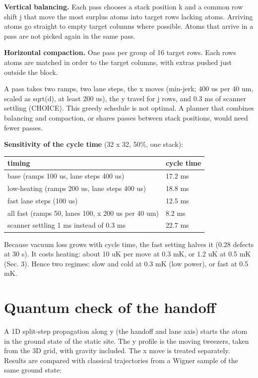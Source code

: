 \textbf{Vertical balancing.} Each pass chooses a stack position k and a
common row shift j that move the most surplus atoms into target rows
lacking atoms. Arriving atoms go straight to empty target columns where
possible. Atoms that arrive in a pass are not picked again in the same
pass.

\textbf{Horizontal compaction.} One pass per group of 16 target rows.
Each row\textquotesingle s atoms are matched in order to the target
columns, with extras pushed just outside the block.

A pass takes two ramps, two lane steps, the x moves (min-jerk; 400 us
per 40 um, scaled as sqrt(d), at least 200 us), the y travel for j rows,
and 0.3 ms of scanner settling (CHOICE). This greedy schedule is not
optimal. A planner that combines balancing and compaction, or shares
passes between stack positions, would need fewer passes.

\textbf{Sensitivity of the cycle time} (32 x 32, 50\%, one stack):

{\small
\begin{longtable}[]{@{}ll@{}}
\toprule\noalign{}
timing & cycle time \\
\midrule\noalign{}
\endhead
\bottomrule\noalign{}
\endlastfoot
base (ramps 100 us, lane steps 400 us) & 17.2 ms \\
low-heating (ramps 200 us, lane steps 400 us) & 18.8 ms \\
fast lane steps (100 us) & 12.5 ms \\
all fast (ramps 50, lanes 100, x 200 us per 40 um) & 8.2 ms \\
scanner settling 1 ms instead of 0.3 ms & 22.7 ms \\
\end{longtable}
}

Because vacuum loss grows with cycle time, the fast setting halves it
(0.28 defects at 30 s). It costs heating: about 10 uK per move at 0.3
mK, or 1.2 uK at 0.5 mK (Sec. 3). Hence two regimes: slow and cold at
0.3 mK (low power), or fast at 0.5 mK.

\hypertarget{3-quantum-check-of-the-handoff}{%
\section{Quantum check of the
handoff}\label{rearrangement-3-quantum-check-of-the-handoff}}

A 1D split-step propagation along y (the handoff and lane axis) starts
the atom in the ground state of the static site. The y profile is the
moving tweezer\textquotesingle s, taken from the 3D grid, with gravity
included. The x move is treated separately. Results are compared with
classical trajectories from a Wigner sample of the same ground state:

